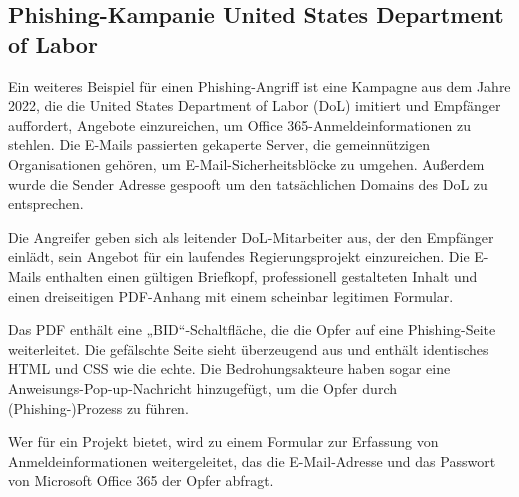 \subsection*{Phishing-Kampanie United States Department of Labor}
Ein weiteres Beispiel für einen Phishing-Angriff ist eine Kampagne aus dem Jahre 2022, die die United States Department
of Labor (DoL) imitiert und Empfänger auffordert, Angebote einzureichen, um Office 365-Anmeldeinformationen zu stehlen.
Die E-Mails passierten gekaperte Server, die gemeinnützigen Organisationen gehören, um E-Mail-Sicherheitsblöcke zu
umgehen. Außerdem wurde die Sender Adresse gespooft um den tatsächlichen Domains des DoL zu entsprechen.

Die Angreifer geben sich als leitender DoL-Mitarbeiter aus, der den Empfänger einlädt, sein Angebot für ein laufendes
Regierungsprojekt einzureichen. Die E-Mails enthalten einen gültigen Briefkopf, professionell gestalteten Inhalt und
einen dreiseitigen PDF-Anhang mit einem scheinbar legitimen Formular.

Das PDF enthält eine „BID“-Schaltfläche, die die Opfer auf eine Phishing-Seite weiterleitet.
Die gefälschte Seite sieht überzeugend aus und enthält identisches HTML und CSS wie die echte. Die Bedrohungsakteure
haben sogar eine Anweisungs-Pop-up-Nachricht hinzugefügt, um die Opfer durch (Phishing-)Prozess zu führen.

Wer für ein Projekt bietet, wird zu einem Formular zur Erfassung von Anmeldeinformationen weitergeleitet, das die
E-Mail-Adresse und das Passwort von Microsoft Office 365 der Opfer abfragt\cite{phishing-dol}.
